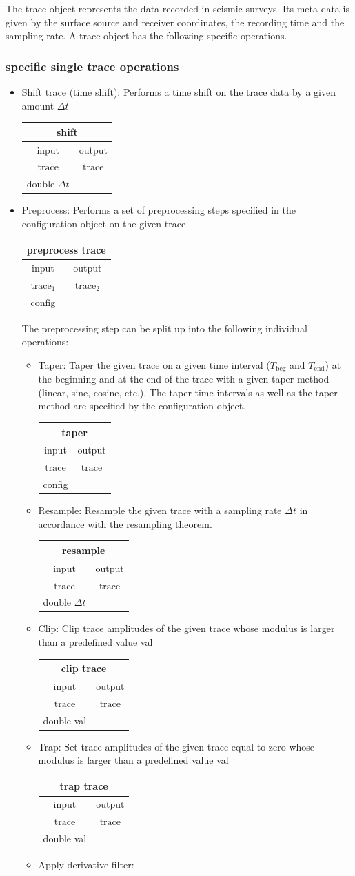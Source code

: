 \documentclass[12pt,a4paper]{article}
\newcommand{\bet}[1]{\begin{center}
		     \begin{tabular}{|c|c|}
		     \hline
		     \multicolumn{2}{|c|}{#1}\\
		     \hline\hline
		     input & output \\
                     \hline}
\newcommand{\eet}{\hline
		  \end{tabular}
		  \end{center}}
\begin{document}
The trace object represents the data recorded in
seismic surveys. 
Its meta data is given by the surface source and receiver coordinates,
the recording time and the sampling rate. 
A trace object has the following specific operations.

\subsubsection{specific single trace operations}

\begin{itemize}
\item Shift trace (time shift):
\newline
Performs a time shift on the trace data by a given amount $\Delta t$
\bet{shift}
$\mathrm{trace}$ & $\mathrm{trace}$\\
double $\Delta t$  & \\
\eet
\item Preprocess:
\newline
Performs a set of preprocessing steps specified in the configuration object 
on the given trace 
\bet{preprocess trace}
$\mathrm{trace}_1$ & $\mathrm{trace}_2$\\
config             & \\
\eet
The preprocessing step can be split up into the following
individual operations:
\begin{itemize}
\item Taper:
\newline
Taper the given trace on a given time interval ($T_{\mathrm{beg}}$ and $T_{\mathrm{end}}$) at the beginning and at the end of the trace with a given taper method (linear, sine, cosine, etc.). The taper time intervals as well as the taper method are specified by the configuration object.
\bet{taper} 
$\mathrm{trace}$ & $\mathrm{trace}$\\
config             & \\
\eet
\item Resample:
\newline
Resample the given trace with a sampling rate $\Delta t$ in accordance 
with the resampling theorem. 
\bet{resample}
$\mathrm{trace}$ & $\mathrm{trace}$\\
double $\Delta t$             & \\
\eet
\item Clip:
\newline
Clip trace amplitudes of the given trace whose modulus is larger than a predefined 
value val
\bet{clip trace}
$\mathrm{trace}$ & $\mathrm{trace}$\\
double val             & \\
\eet
\item Trap:
\newline
Set trace amplitudes of the given trace equal to zero whose modulus is larger than a predefined value val
\bet{trap trace}
$\mathrm{trace}$ & $\mathrm{trace}$\\
double val         & \\
\eet 
\item Apply derivative filter:
\newline


\end{itemize}
\end{itemize}
\end{document}
